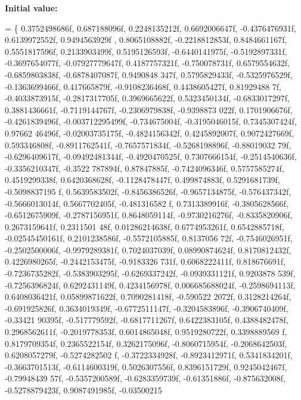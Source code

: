 {\bfseries Initial value\+:}
\begin{DoxyCode}
=
\{
    0.3752498686f, 0.687188096f, 0.2248135212f, 0.6692006647f, -0.4376476931f, 0.6139972552f, 0.9494563929f
      , 0.8065108882f, -0.2218812853f, 0.8484661167f, 0.5551817596f, 0.2133903499f, 0.5195126593f, -0.6440141975f,
       -0.5192897331f, -0.3697654077f,
    -0.07927779647f, 0.4187757321f, -0.750078731f, 0.6579554632f, -0.6859803838f, -0.6878407087f, 0.9490848
      347f, 0.5795829433f, -0.5325976529f, -0.1363699466f, 0.417665879f, -0.9108236468f, 0.4438605427f, 0.81929488
      7f, -0.4033873915f, -0.2817317705f,
    0.3969665622f, 0.5323450134f, -0.6833017297f, 0.3881436661f, -0.7119144767f, -0.2306979838f, -0.9398873
      022f, 0.1701906676f, -0.4261839496f, -0.003712295499f, -0.734675004f, -0.3195046015f, 0.7345307424f, 0.97662
      46496f, -0.02003735175f, -0.4824156342f,
    0.4245892007f, 0.9072427669f, 0.593346808f, -0.8911762541f, -0.7657571834f, -0.5268198896f, -0.88019032
      79f, -0.6296409617f, -0.09492481344f, -0.4920470525f, 0.7307666154f, -0.2514540636f, -0.3356210347f, -0.3522
      787894f, 0.87847885f, -0.7424096346f,
    0.5757585274f, 0.4519299338f, 0.6420368628f, -0.1128478447f, 0.499874883f, 0.5291681739f, -0.5098837195
      f, 0.5639583502f, -0.8456386526f, -0.9657134875f, -0.576437342f, -0.5666013014f, 0.5667702405f, -0.481316582
      f, 0.7313389916f, -0.3805628566f,
    -0.6512675909f, -0.2787156951f, 0.8648059114f, -0.9730216276f, -0.8335820906f, 0.2673159641f, 0.2311501
      48f, 0.01286214638f, 0.6774953261f, 0.6542885718f, -0.02545450161f, 0.2101238586f, -0.5572105885f, 0.8137056
      72f, -0.7546026951f, -0.2502500006f,
    -0.9979289381f, 0.7024037039f, 0.08990874624f, 0.8170812432f, 0.4226980265f, -0.2442153475f, -0.9183326
      731f, 0.6068222411f, 0.818676691f, -0.7236735282f, -0.5383903295f, -0.6269337242f, -0.0939331121f, 0.9203878
      539f, -0.7256396824f, 0.6292431149f,
    0.4234156978f, 0.006685688024f, -0.2598694113f, 0.6408036421f, 0.05899871622f, 0.7090281418f, -0.590522
      2072f, 0.3128214264f, -0.691925826f, 0.3634019349f, -0.6772511147f, -0.3204583896f, -0.3906740409f, -0.33421
      90395f, -0.517779592f, -0.6817711267f,
    0.6422383105f, 0.4388482478f, 0.2968562611f, -0.2019778353f, 0.6014865048f, 0.9519280722f, 0.3398889569
      f, 0.8179709354f, 0.2365522154f, 0.3262175096f, -0.8060715954f, -0.2068642503f, 0.6208057279f, -0.5274282502
      f, -0.3722334928f, -0.8923412971f,
    0.5341834201f, -0.3663701513f, -0.6114600319f, 0.5026307556f, 0.8396151729f, 0.9245042467f, -0.79948439
      57f, -0.5357200589f, -0.6283359739f, -0.61351886f, -0.875632008f, -0.5278879423f, 0.9087491985f, -0.03500215

\end{DoxyCode}
